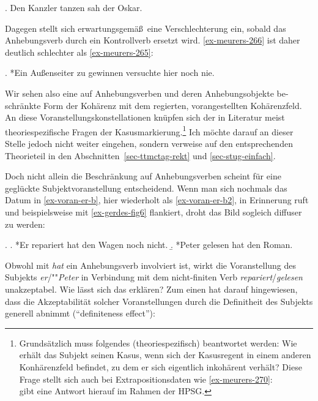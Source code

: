 \ex. Den Kanzler tanzen sah der Oskar. \hfill \citep[(275)]{Meurers:99}\label{ex-meurers-275}

Dagegen stellt sich erwartungsgemä\ss\ eine Verschlechterung ein, sobald das Anhebungsverb durch ein Kontrollverb ersetzt wird. \ref{ex-meurers-266} ist daher deutlich schlechter als \ref{ex-meurers-265}: 

\ex. *Ein Au\ss enseiter zu gewinnen versuchte hier noch nie.\\
\citep[(266)]{Meurers:99}\label{ex-meurers-266}

Wir sehen also eine auf Anhebungsverben und deren Anhebungsobjekte be-\linebreak schränkte Form der Kohärenz mit dem regierten, vorangestellten Kohärenzfeld. An diese Voranstellungskonstellationen knüpfen sich der in Literatur meist theoriespezifische Fragen der Kasusmarkierung.\footnote{Grundsätzlich muss folgendes (theoriespezifisch) beantwortet werden: Wie erhält das Subjekt seinen Kasus, wenn sich der Kasusregent in einem anderen Konhärenzfeld befindet, zu dem er sich eigentlich inkohärent verhält? Diese Frage stellt sich auch bei Extrapositionsdaten wie \ref{ex-meurers-270}:\\
\citet[316ff]{Meurers:99} gibt eine Antwort hierauf im Rahmen der HPSG.} Ich möchte darauf an dieser Stelle jedoch nicht weiter eingehen, sondern verweise auf den entsprechenden Theorieteil in den Abschnitten~\ref{sec-ttmctag-rekt} und \ref{sec-stug-einfach}.

Doch nicht allein die Beschränkung auf Anhebungsverben scheint für eine geglückte Subjektvoranstellung entscheidend. Wenn man sich nochmals das Datum in \ref{ex-voran-er-b}, hier wiederholt als \ref{ex-voran-er-b2}, in Erinnerung ruft und beispielsweise mit \ref{ex-gerdes-fig6} flankiert, droht das Bild sogleich diffuser zu werden: 

\ex. 
\a. *Er repariert hat den Wagen noch nicht.\label{ex-voran-er-b2} 
\b. *Peter gelesen hat den Roman. \hfill \citep[Abbildung~6]{Gerdes:04}\label{ex-gerdes-fig6} 

Obwohl mit {\it hat} ein Anhebungsverb involviert ist, wirkt die Voranstellung des Subjekts {\it er}/""{\it Peter} in Verbindung mit dem nicht-finiten Verb {\it repariert}/{\it gelesen} unakzeptabel. Wie lässt sich das erklären? Zum einen hat \cite{Haider:90} darauf hingewiesen, dass die Akzeptabilität solcher Voranstellungen durch die Definitheit des Subjekts generell abnimmt ("`definiteness effect"'):   

